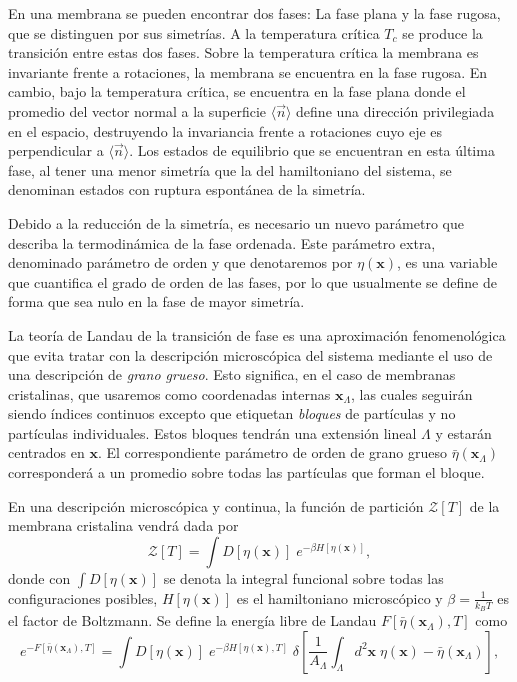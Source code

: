 En una membrana se pueden encontrar dos fases: La fase plana y la fase
rugosa, que se distinguen por sus simetrías. A la temperatura crítica $T_c$ se
produce la transición entre estas dos fases. Sobre la temperatura crítica la
membrana es invariante frente a rotaciones, 
la membrana se encuentra en la fase rugosa. En cambio, bajo la temperatura
crítica, se encuentra en la fase plana donde el promedio del vector normal a
la superficie $\langle \vec{n}\rangle$ define una dirección privilegiada en el
espacio, destruyendo la invariancia frente a rotaciones cuyo eje es
perpendicular a $\langle \vec{n}\rangle$. Los estados de equilibrio que se
encuentran en esta última fase, al tener una menor simetría que la del
hamiltoniano del sistema, se denominan estados con ruptura espontánea de la
simetría. 
 
Debido a la reducción de la simetría, es necesario un nuevo parámetro que 
describa la termodinámica de la fase ordenada. Este parámetro
extra, denominado parámetro de orden y que denotaremos por $\eta(\mathbf{x})$,
es una 
variable que cuantifica el grado de orden de
las fases, por lo que usualmente se define de forma que sea nulo en la fase
de mayor simetría.

\begin{figure}[h]
\centering
{}
\quad
{}
\end{figure}

La teoría de Landau de la transición de fase es una aproximación
fenomenológica que evita tratar con la descripción microscópica del sistema
mediante el uso de una descripción de \textit{grano grueso}. Esto significa,
en el caso de membranas cristalinas, que usaremos como coordenadas internas
$\mathbf{x}_{\Lambda}$, las cuales seguirán  siendo índices continuos excepto
que etiquetan \textit{bloques} de partículas y no partículas
individuales. Estos bloques tendrán una extensión lineal $\Lambda$ y estarán
centrados en $\mathbf{x}$. El correspondiente parámetro de orden de grano
grueso $\bar{\eta}(\mathbf{x}_{\Lambda})$ corresponderá a un promedio sobre
todas las partículas que forman el bloque.

En una descripción microscópica y continua, la función de partición
$\mathcal{Z}[T]$ de la membrana cristalina vendrá dada por
\begin{equation}\label{Zmicroscopica}
\mathcal{Z}[T]=\int D[\eta(\mathbf{x})]\; e^{-\beta H[\eta(\mathbf{x})]},
\end{equation}
donde con $\int D[\eta(\mathbf{x})]$ se denota la integral funcional sobre
todas las configuraciones posibles, $H[\eta(\mathbf{x})]$ es el hamiltoniano
microscópico y $\beta=\frac{1}{k_BT}$ es el factor de Boltzmann. Se define la
energía libre de Landau $F[\bar{\eta}(\mathbf{x}_{\Lambda}),T]$ como 
\begin{equation*}
e^{-F[\bar{\eta}(\mathbf{x}_{\Lambda}),T]}=\int D[\eta(\mathbf{x})]\; e^{-\beta
  H[\eta(\mathbf{x}),T]}
  \;\delta\left[\frac{1}{A_{\Lambda}}\int_{\Lambda} d^2\mathbf{x}\; \eta(\mathbf{x})-\bar{\eta}(\mathbf{x}_{\Lambda})\right],
\end{equation*}

